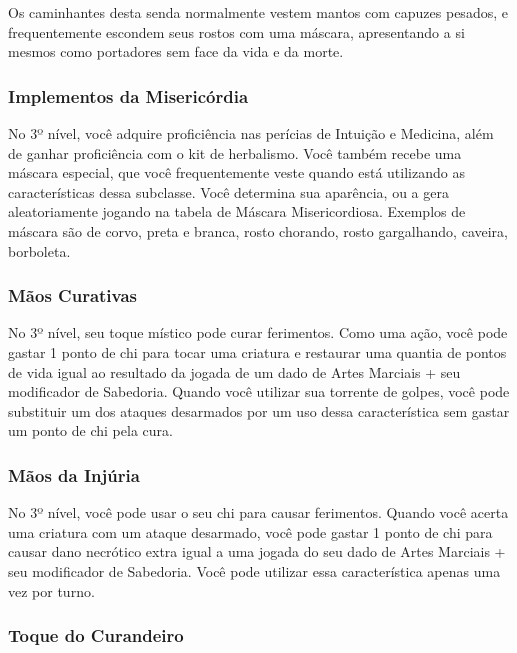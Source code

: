 \begin{multicols}{2}
Os caminhantes desta senda normalmente vestem mantos com capuzes pesados, e
frequentemente escondem seus rostos com uma máscara, apresentando a si mesmos
como portadores sem face da vida e da morte.

\subsubsection*{Implementos da Misericórdia}%
\label{ssub:implementos_da_misericordia}

No 3º nível, você adquire proficiência nas perícias de Intuição e Medicina, além
de ganhar proficiência com o kit de herbalismo. Você também recebe uma máscara
especial, que você frequentemente veste quando está utilizando as
características dessa subclasse. Você determina sua aparência, ou a gera
aleatoriamente jogando na tabela de Máscara Misericordiosa. Exemplos de máscara
são de corvo, preta e branca, rosto chorando, rosto gargalhando, caveira,
borboleta.

\subsubsection{Mãos Curativas}%
\label{ssub:maos_curativas}

No 3º nível, seu toque místico pode curar ferimentos. Como uma ação, você pode
gastar 1 ponto de chi para tocar uma criatura e restaurar uma quantia de pontos
de vida igual ao resultado da jogada de um dado de Artes Marciais + seu
modificador de Sabedoria. Quando você utilizar sua torrente de golpes, você pode
substituir um dos ataques desarmados por um uso dessa característica sem gastar
um ponto de chi pela cura.

\subsubsection*{Mãos da Injúria}%
\label{ssub:maos_da_injuria}

No 3º nível, você pode usar o seu chi para causar ferimentos. Quando você acerta
uma criatura com um ataque desarmado, você pode gastar 1 ponto de chi para
causar dano necrótico extra igual a uma jogada do seu dado de Artes Marciais +
seu modificador de Sabedoria. Você pode utilizar essa característica apenas uma
vez por turno.

\subsubsection*{Toque do Curandeiro}%
\label{ssub:toque_do_curandeiro}


\end{multicols}
